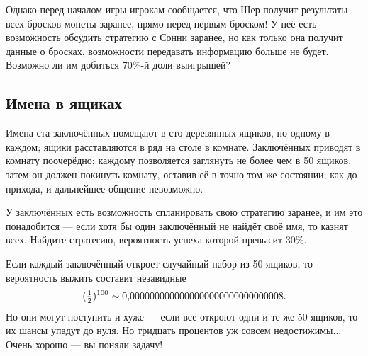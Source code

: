 Однако перед началом игры игрокам сообщается, что Шер получит результаты всех бросков монеты заранее, прямо перед первым броском!
У неё есть возможность обсудить стратегию с Сонни заранее, но как только она получит данные о бросках, возможности передавать информацию больше не будет.
Возможно ли им добиться 70\%-й доли выигрышей?

\subsection*{Имена в ящиках}\label{Имена в ящиках}

Имена ста заключённых помещают в сто деревянных ящиков, по одному в каждом;
ящики расставляются в ряд на столе в комнате.
Заключённых приводят в комнату поочерёдно;
каждому позволяется заглянуть не более чем в 50 ящиков,
затем он должен покинуть комнату, оставив её в точно том же состоянии, как до прихода, и дальнейшее общение невозможно.

У заключённых есть возможность спланировать свою стратегию заранее, и им это понадобится --- если хотя бы один заключённый не найдёт своё имя, то казнят всех.
Найдите стратегию, вероятность успеха которой превысит 30\%.

 Если каждый заключённый откроет случайный набор из 50 ящиков, то вероятность выжить составит незавидные
\[(\tfrac12)^{100}\z\sim 0{,}0000000000000000000000000000008.\]
Но они могут поступить и хуже --- если все откроют одни и те же 50 ящиков, то их шансы упадут до нуля.
Но тридцать процентов уж совсем недостижимы...
Очень хорошо --- вы поняли задачу!

